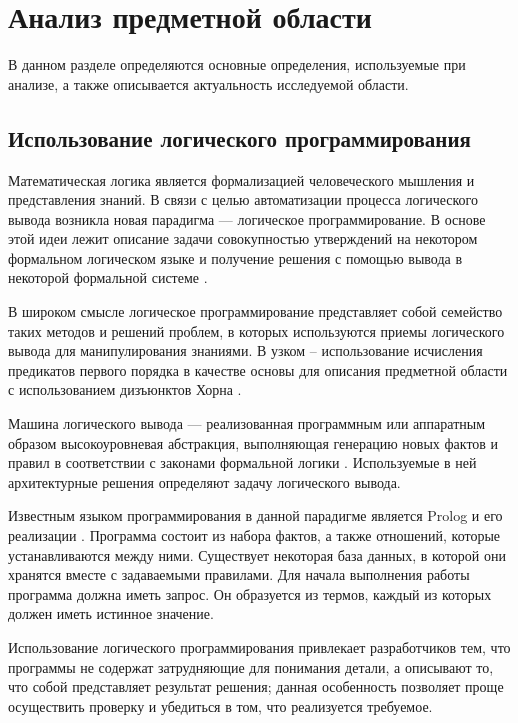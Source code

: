 \chapter{Анализ предметной области}

В данном разделе определяются основные определения, используемые при анализе, а также описывается актуальность исследуемой области.

\section{Использование логического программирования}
Математическая логика является формализацией человеческого мышления и представления знаний. В связи с целью автоматизации процесса логического вывода возникла новая парадигма --- логическое программирование. В основе этой идеи лежит описание задачи совокупностью утверждений на некотором формальном логическом языке и получение решения с помощью вывода в некоторой формальной системе \cite{logic_researchers1}.

В широком смысле логическое программирование представляет собой семейство таких методов и решений проблем, в которых используются приемы логического вывода для манипулирования знаниями. В узком -- использование исчисления предикатов первого порядка в качестве основы для описания предметной области с использованием дизъюнктов Хорна \cite{horn_disjunction}.  

Машина логического вывода --- реализованная программным или аппаратным образом высокоуровневая абстракция, выполняющая генерацию новых фактов и правил в соответствии с законами формальной логики \cite{machine_logic_output}. Используемые в ней архитектурные решения определяют задачу логического вывода. 

Известным языком программирования в данной парадигме является Prolog и его реализации \cite{prolog}. Программа состоит из набора фактов, а также отношений, которые устанавливаются между ними. Существует некоторая база данных, в которой они хранятся вместе с задаваемыми правилами. Для начала выполнения работы программа должна иметь запрос. Он образуется из термов, каждый из которых должен иметь истинное значение.

Использование логического программирования привлекает разработчиков тем, что программы не содержат затрудняющие для понимания детали, а описывают то, что собой представляет результат решения; данная особенность позволяет проще осуществить проверку и убедиться в том, что реализуется требуемое.


